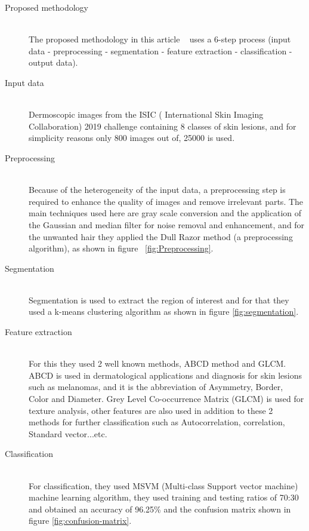 \begin{description}
    \item [Proposed methodology] \hfill \\
    The proposed methodology in this article ~\cite{Krishna2020} uses a 6-step process (input data - preprocessing - segmentation - feature extraction - classification - output data).
    \item [Input data] \hfill \\ 
        Dermoscopic images from the ISIC ( International Skin Imaging Collaboration) 2019 challenge containing 8 classes of skin lesions, and for simplicity reasons only 800 images out of, 25000 is used.
    
    \item [Preprocessing] \hfill \\
        Because of the heterogeneity of the input data, a preprocessing step is required to enhance the quality of images and remove irrelevant parts. The main techniques used here are gray scale conversion and the application of the Gaussian and median filter for noise removal and enhancement, and for the unwanted hair they applied the Dull Razor method (a preprocessing algorithm), as shown in figure ~\ref{fig:Preprocessing}.

    \item [Segmentation] \hfill \\
        Segmentation is used to extract the region of interest and for that they used a k-means clustering algorithm as shown in figure \ref{fig:segmentation}.
        
    \item [Feature extraction] \hfill \\
        For this they used 2 well known methods, ABCD method and GLCM. ABCD is used in dermatological applications and diagnosis for skin lesions such as melanomas, and it is the abbreviation of Asymmetry, Border, Color and Diameter. Grey Level Co-occurrence Matrix (GLCM) is used for texture analysis, other features are also used in addition to these 2 methods for further classification such as Autocorrelation, correlation, Standard vector...etc.
    
    \item [Classification] \hfill \\
        For classification, they used MSVM (Multi-class Support vector machine) machine learning algorithm, they used training and testing ratios of 70:30 and obtained an accuracy of 96.25\% and the confusion matrix shown in figure \ref{fig:confusion-matrix}.
\end{description}

